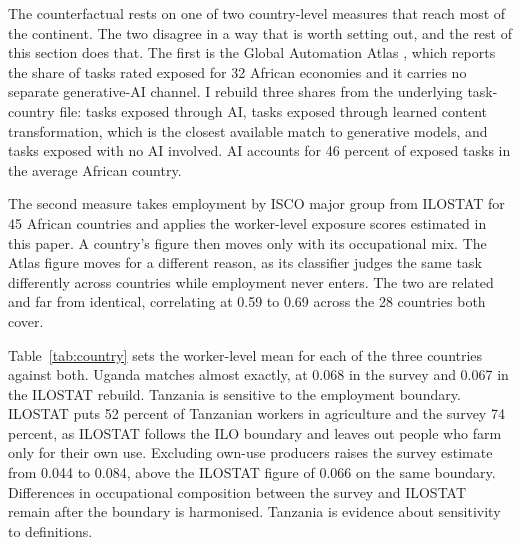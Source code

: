 The counterfactual rests on one of two country-level measures that reach most
of the continent. The two disagree in a way that is worth setting out, and the
rest of this section does that.
The first is the Global Automation Atlas \citep{atlas2026}, which reports the
share of tasks rated exposed for 32 African economies and it carries 
no separate generative-AI channel. I rebuild three shares
from the underlying task-country file: tasks exposed through AI, tasks
exposed through learned content transformation, which is the closest available
match to generative models, and tasks exposed with no AI involved. AI accounts
for 46 percent of exposed tasks in the average African country.

The second measure takes employment by ISCO major group from
ILOSTAT \citep{ilostat} for 45 African countries and applies the worker-level
exposure scores estimated in this paper. A country's figure then moves only with
its occupational mix. The Atlas figure moves for a different reason, as its
classifier judges the same task differently across countries while employment
never enters. The two are related and far from identical, correlating at 0.59 to
0.69 across the 28 countries both cover.

Table~\ref{tab:country} sets the worker-level mean for each of the three
countries against both. Uganda matches almost exactly, at 0.068 in the survey
and 0.067 in the ILOSTAT rebuild. Tanzania is sensitive to the employment
boundary. ILOSTAT puts 52 percent of Tanzanian workers in agriculture and the
survey 74 percent, as ILOSTAT follows the ILO boundary and leaves out people
who farm only for their own use. Excluding own-use producers raises the survey
estimate from 0.044 to 0.084, above the ILOSTAT figure of 0.066 on the same
boundary. Differences in occupational composition between the survey and
ILOSTAT remain after the boundary is harmonised. Tanzania is evidence about
sensitivity to definitions.


